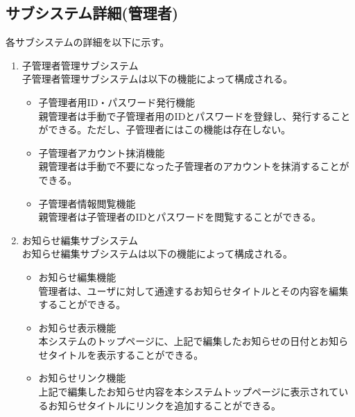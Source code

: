 \documentclass[a4j]{jarticle}
\begin{document}
\subsection{サブシステム詳細(管理者)}
各サブシステムの詳細を以下に示す。
\begin{enumerate}

  \item 子管理者管理サブシステム\\
  子管理者管理サブシステムは以下の機能によって構成される。
  \begin{itemize}
    \item 子管理者用ID・パスワード発行機能\\
    親管理者は手動で子管理者用のIDとパスワードを登録し、発行することができる。ただし、子管理者にはこの機能は存在しない。
    \item 子管理者アカウント抹消機能\\
    親管理者は手動で不要になった子管理者のアカウントを抹消することができる。
    \item 子管理者情報閲覧機能\\
    親管理者は子管理者のIDとパスワードを閲覧することができる。
  \end{itemize}


  \item お知らせ編集サブシステム\\
  お知らせ編集サブシステムは以下の機能によって構成される。
  \begin{itemize}
    \item お知らせ編集機能\\
    管理者は、ユーザに対して通達するお知らせタイトルとその内容を編集することができる。
    \item お知らせ表示機能\\
    本システムのトップページに、上記で編集したお知らせの日付とお知らせタイトルを表示することができる。
    \item お知らせリンク機能\\
    上記で編集したお知らせ内容を本システムトップページに表示されているお知らせタイトルにリンクを追加することができる。\\
  \end{itemize}



\end{enumerate}
\end{document}
